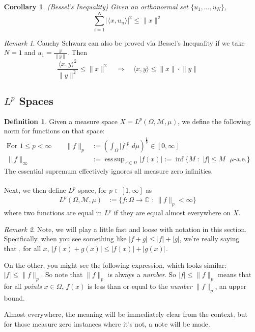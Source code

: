 \documentclass[12pt]{article}
\theoremstyle{plain}
\newtheorem{cor}[thm]{Corollary}
\theoremstyle{definition}
\newtheorem{defn}[thm]{Definition}
\theoremstyle{remark}
\newtheorem*{rmk}{Remark}
\DeclareMathOperator*{\essup}{ess\,sup}
\begin{document}
\begin{cor}
\emph{(Bessel's Inequality)} 
Given an orthonormal set $\{u_1,\ldots,u_N\}$, 
\[
    \sum_{i=1}^N 
    \bigl\lvert\langle x,u_n\rangle\bigr\rvert^2 
    \leq \lVert x\rVert^2
\]
\end{cor}

\begin{rmk}
Cauchy Schwarz can also be proved via Bessel's Inequality if we take $N=1$ and $u_1=\frac{y}{\lVert y\rVert}$. Then 
\[
    \frac{\langle x,y\rangle^2}{\lVert y\rVert^2} \leq \lVert x\rVert^2
    \quad\Rightarrow\quad
    \langle x,y\rangle \leq \lVert x\rVert\cdot \lVert y\rVert
\]
\end{rmk}

\subsection{$L^p$ Spaces}


\begin{defn}
Given a measure space $X=L^p(\Omega,\mathscr{M},\mu)$, we define the following norm for functions on that space:
\begin{align*}
    \text{For }1\leq p < \infty \qquad
    \lVert f\rVert_p &:= \left(\int_\Omega 
    |f|^p \; d\mu\right)^{\frac{1}{p}}
    \in [0,\infty]\\
    \lVert f\rVert_\infty &:=
    \essup_{x\in\Omega} |f(x)|
    := \inf\{M\;:\; |f|\leq M \text{ $\mu$-a.e.}\}
\end{align*}
The essential supremum effectively ignores all measure zero infinities. 
\\
\\
Next, we then define $L^p$ space, for $p\in[1,\infty]$ as 
\begin{align*}
    L^p(\Omega,\mathscr{M},\mu)
    &:=\{f: \Omega \rightarrow \mathbb{C} \;:\;
    \lVert f\rVert_p < \infty\} 
\end{align*}
where two functions are equal in $L^p$ if they are equal almost everywhere on $X$.
\end{defn}

\begin{rmk}
Note, we will play a little fast and loose with notation in this section. Specifically, when you see something like $|f+g|\leq |f| + |g|$, we're really saying that , for all $x$, $|f(x)+g(x)|\leq |f(x)| + |g(x)|$. 

On the other, you might see the following expression, which looks similar: $|f|\leq \lVert f\rVert_p$. So note that $\lVert f\rVert_p$ is always a \emph{number}. So $|f|\leq\lVert f\rVert_p$ means that for all \emph{points} $x\in\Omega$, $f(x)$ is less than or equal to the \emph{number} $\lVert f\rVert_p$, an upper bound. 

Almost everywhere, the meaning will be immediately clear from the context, but for those measure zero instances where it's not, a note will be made. 
\end{rmk}
\end{document}
